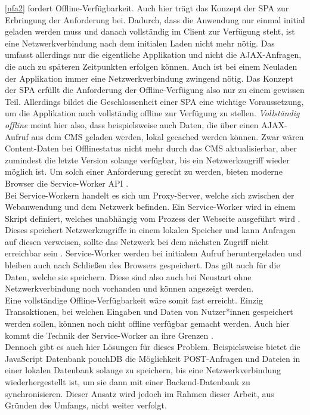 \ref{nfa2} fordert Offline-Verfügbarkeit. Auch hier trägt das Konzept der SPA zur 
Erbringung der Anforderung bei. Dadurch, dass die Anwendung nur einmal initial geladen werden muss 
und danach vollständig im Client zur Verfügung steht, ist eine Netzwerkverbindung nach dem initialen 
Laden nicht mehr nötig. Das umfasst allerdings nur die eigentliche Applikation und nicht die
AJAX-Anfragen, die auch zu späteren Zeitpunkten erfolgen können. Auch ist bei einem Neuladen
der Applikation immer eine Netzwerkverbindung zwingend nötig. Das Konzept der SPA erfüllt
die Anforderung der Offline-Verfügung also nur zu einem gewissen Teil. Allerdings bildet die Geschlossenheit
einer SPA eine wichtige Voraussetzung, um die Applikation auch vollständig offline zur Verfügung
zu stellen. \emph{Vollständig offline} meint hier also, dass beispielsweise auch Daten, die über
einen AJAX-Aufruf aus dem CMS geladen werden, lokal gecached werden können. Zwar wären Content-Daten bei
Offlinestatus nicht mehr durch das CMS aktualisierbar, aber zumindest die letzte Version solange verfügbar,
bis ein Netzwerkzugriff wieder möglich ist. Um solch einer Anforderung gerecht zu werden, bieten moderne 
Browser die Service-Worker API \cite{service-worker-api}.\\ 
Bei Service-Workern handelt es sich um Proxy-Server, welche sich zwischen der Webanwendung und dem 
Netzwerk befinden. Ein Service-Worker wird in einem Skript definiert, welches
unabhängig vom Prozess der Webseite ausgeführt wird \cite{service-worker-intro}. 
Dieses speichert Netzwerkzugriffe in einem lokalen Speicher und kann Anfragen auf
diesen verweisen, sollte das Netzwerk bei dem nächsten Zugriff nicht erreichbar sein \cite{service-worker-api}.
Service-Worker werden bei initialem Aufruf heruntergeladen und bleiben auch nach Schließen des Browsers
gespeichert. Das gilt auch für die Daten, welche sie speichern. Diese sind also auch bei Neustart ohne
Netzwerkverbindung noch vorhanden und können angezeigt werden.\\
Eine vollständige Offline-Verfügbarkeit wäre somit fast erreicht. Einzig Transaktionen, bei welchen Eingaben
und Daten von Nutzer*innen gespeichert werden sollen, können noch nicht offline verfügbar gemacht werden.
Auch hier kommt die Technik der Service-Worker an ihre Grenzen \cite{service-worker-post}.\\
Dennoch gibt es auch hier Lösungen für dieses
Problem. Beispielsweise bietet die JavaScript Datenbank pouchDB \cite{pouchdb} die Möglichkeit POST-Anfragen
und Dateien in einer lokalen Datenbank solange zu speichern, bis eine Netzwerkverbindung wiederhergestellt ist,
um sie dann mit einer Backend-Datenbank zu synchronisieren. Dieser Ansatz wird jedoch im Rahmen dieser Arbeit,
aus Gründen des Umfangs, nicht weiter verfolgt.\\

